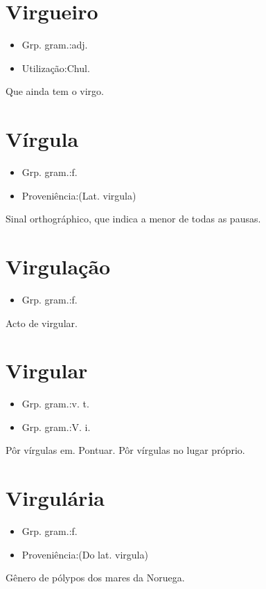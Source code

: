 \documentclass{article}
\begin{document}
\section{Virgueiro}
\begin{itemize}
\item {Grp. gram.:adj.}
\end{itemize}
\begin{itemize}
\item {Utilização:Chul.}
\end{itemize}
Que ainda tem o virgo.
\section{Vírgula}
\begin{itemize}
\item {Grp. gram.:f.}
\end{itemize}
\begin{itemize}
\item {Proveniência:(Lat. \textunderscore virgula\textunderscore )}
\end{itemize}
Sinal orthográphico, que indica a menor de todas as pausas.
\section{Virgulação}
\begin{itemize}
\item {Grp. gram.:f.}
\end{itemize}
Acto de virgular.
\section{Virgular}
\begin{itemize}
\item {Grp. gram.:v. t.}
\end{itemize}
\begin{itemize}
\item {Grp. gram.:V. i.}
\end{itemize}
Pôr vírgulas em.
Pontuar.
Pôr vírgulas no lugar próprio.
\section{Virgulária}
\begin{itemize}
\item {Grp. gram.:f.}
\end{itemize}
\begin{itemize}
\item {Proveniência:(Do lat. \textunderscore virgula\textunderscore )}
\end{itemize}
Gênero de pólypos dos mares da Noruega.
\end{document}

